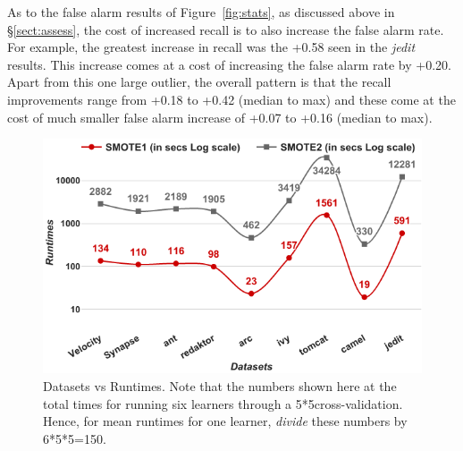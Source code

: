 \documentclass[10pt,conference]{IEEEtran}
\theoremstyle{break}
\theoremstyle{break}
\newcommand{\tion}[1]{{\S}\ref{sect:#1}}
\begin{document}
As to the false alarm results of Figure~\ref{fig:stats}, as discussed above in \tion{assess}, the cost of increased recall is to also increase
the false alarm rate. For example, the greatest increase in recall was the +0.58 seen in the {\em jedit} results. This increase comes at a cost
of increasing the false alarm rate by +0.20. Apart from this one large outlier, the overall pattern is that the recall improvements range from +0.18 to +0.42 (median to max)
and these come at the cost of much smaller false alarm increase of +0.07 to +0.16 (median to max). 




\begin{figure}[!htbp]
  \captionsetup{justification=centering}
  \includegraphics[width=\linewidth]{./fig/runtimes.png}
  \caption{Datasets vs Runtimes. Note that the numbers
  shown here at the total times for running six learners through a 5*5cross-validation. Hence, for mean
  runtimes for one learner, {\em divide} these numbers by 6*5*5=150.}
  \label{runtime}
\vspace{-0.7cm}
\end{figure}
\end{document}
